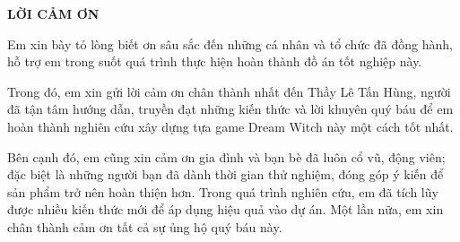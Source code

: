 \documentclass[../DoAn.tex]{subfiles}
\begin{document}
\begin{center}
    \Large{\textbf{LỜI CẢM ƠN}}\\
\end{center}
\vspace{1cm}

Em xin bày tỏ lòng biết ơn sâu sắc đến những cá nhân và tổ chức đã đồng hành, hỗ trợ em trong suốt quá trình thực hiện hoàn thành đồ án tốt nghiệp này. 

Trong đó, em xin gửi lời cảm ơn chân thành nhất đến Thầy Lê Tấn Hùng, người đã tận tâm hướng dẫn, truyền đạt những kiến thức và lời khuyên quý báu để em hoàn thành nghiên cứu xây dựng tựa game Dream Witch này một cách tốt nhất. 

Bên cạnh đó, em cũng xin cảm ơn gia đình và bạn bè đã luôn cổ vũ, động viên; đặc biệt là những người bạn đã dành thời gian thử nghiệm, đóng góp ý kiến để sản phẩm trở nên hoàn thiện hơn. Trong quá trình nghiên cứu, em đã tích lũy được nhiều kiến thức mới để áp dụng hiệu quả vào dự án. Một lần nữa, em xin chân thành cảm ơn tất cả sự ủng hộ quý báu này.
\end{document}
